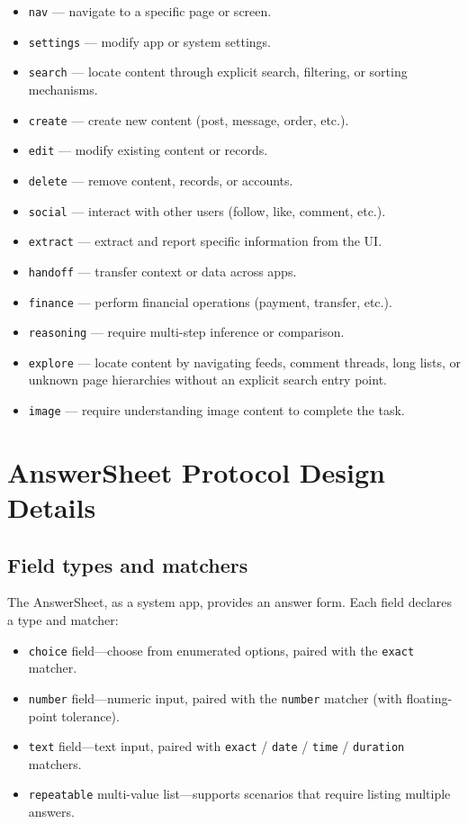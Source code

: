 \documentclass{llmxive}
\begin{document}
\begin{itemize}
  \item \texttt{nav} --- navigate to a specific page or screen.
  \item \texttt{settings} --- modify app or system settings.
  \item \texttt{search} --- locate content through explicit search, filtering, or sorting mechanisms.
  \item \texttt{create} --- create new content (post, message, order, etc.).
  \item \texttt{edit} --- modify existing content or records.
  \item \texttt{delete} --- remove content, records, or accounts.
  \item \texttt{social} --- interact with other users (follow, like, comment, etc.).
  \item \texttt{extract} --- extract and report specific information from the UI.
  \item \texttt{handoff} --- transfer context or data across apps.
  \item \texttt{finance} --- perform financial operations (payment, transfer, etc.).
  \item \texttt{reasoning} --- require multi-step inference or comparison.
  \item \texttt{explore} --- locate content by navigating feeds, comment threads, long lists, or unknown page hierarchies without an explicit search entry point.
  \item \texttt{image} --- require understanding image content to complete the task.
\end{itemize}


\section{AnswerSheet Protocol Design Details}\label{app:answersheet}

\subsection{Field types and matchers}

The AnswerSheet, as a system app, provides an answer form. Each field declares a type and matcher:

\begin{itemize}
  \item \texttt{choice} field—choose from enumerated options, paired with the \texttt{exact} matcher.
  \item \texttt{number} field—numeric input, paired with the \texttt{number} matcher (with floating-point tolerance).
  \item \texttt{text} field—text input, paired with \texttt{exact} / \texttt{date} / \texttt{time} / \texttt{duration} matchers.
  \item \texttt{repeatable} multi-value list—supports scenarios that require listing multiple answers.
\end{itemize}
\end{document}
